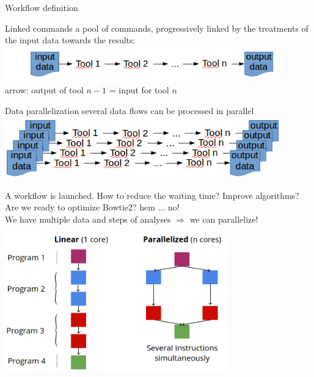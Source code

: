 \begin{frame}{Workflow definition}
\begin{block}{Linked commands}
 a pool of commands, progressively linked by the treatments of the input data towards the results:\\
    \includegraphics[width=12cm]{03_workflow/images/FAIR_workflow_schema.png}\\
   arrow: output of tool $n-1$ = input for tool $n$
\end{block}
\begin{block}{Data parallelization}
     several data flows can be processed in parallel \includegraphics[width=12cm]{03_workflow/images/FAIR_workflow_schema_parallelization.png}
\end{block}
\end{frame}
\begin{frame}{A workflow is launched. How to reduce the waiting time?}
    Improve algorithms? Are we ready to optimize Bowtie2? hem ... no!\\
    We have multiple data and steps of analyses $\Rightarrow$ we can parallelize!\\
    \begin{center}
            \includegraphics[height=6cm]{03_workflow/images/FAIR_WF_linear_vs_parallel_en.png}
    \end{center}
\end{frame}
